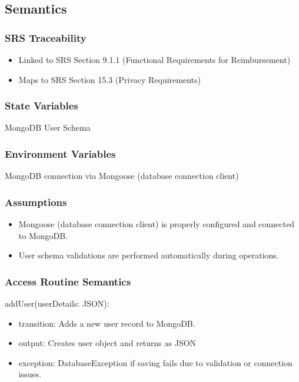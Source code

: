 \documentclass[12pt, titlepage]{article}
\begin{document}
\subsection{Semantics}

\subsubsection{SRS Traceability}
\begin{itemize}
  \item Linked to SRS Section 9.1.1 (Functional Requirements for Reimbursement)
  \item Maps to SRS Section 15.3 (Privacy Requirements)
\end{itemize}

\subsubsection{State Variables}
MongoDB User Schema

\subsubsection{Environment Variables}
MongoDB connection via Mongoose (database connection client)

\subsubsection{Assumptions}
\begin{itemize}
  \item Mongoose (database connection client) is properly configured and connected to MongoDB.
  \item User schema validations are performed automatically during operations.
\end{itemize}

\subsubsection{Access Routine Semantics}

\noindent addUser(userDetails: JSON):
\begin{itemize}
  \item transition: Adds a new user record to MongoDB.
  \item output: Creates user object and returns as JSON
  \item exception: DatabaseException if saving fails due to validation or connection issues.
\end{itemize}
\end{document}
